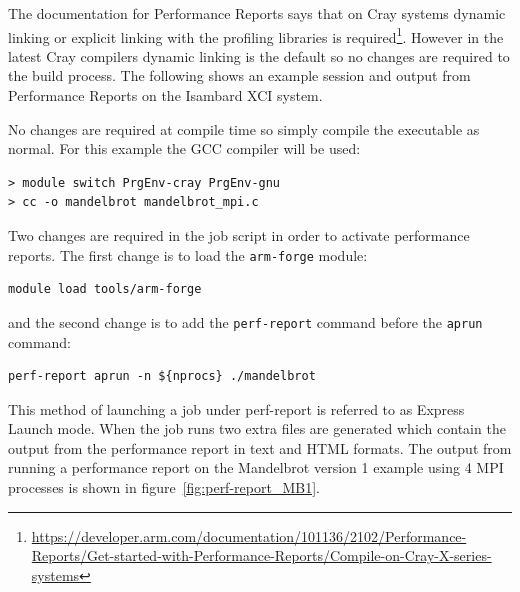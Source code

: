 \documentclass[a4paper,titlepage]{article}
\begin{document}
The documentation for Performance Reports says that on Cray systems dynamic linking or explicit linking with the profiling libraries is required\footnote{\url{https://developer.arm.com/documentation/101136/2102/Performance-Reports/Get-started-with-Performance-Reports/Compile-on-Cray-X-series-systems}}. However in the latest Cray compilers dynamic linking is the default so no changes are required to the build process. The following shows an example session and output from Performance Reports on the Isambard XCI system.

No changes are required at compile time so simply compile the executable as normal. For this example the GCC compiler will be used:
\begin{verbatim}
> module switch PrgEnv-cray PrgEnv-gnu
> cc -o mandelbrot mandelbrot_mpi.c
\end{verbatim}
Two changes are required in the job script in order to activate performance reports. The first change is to load the \texttt{arm-forge} module:
\begin{verbatim}
module load tools/arm-forge
\end{verbatim}
and the second change is to add the \texttt{perf-report} command before the \texttt{aprun} command:
\begin{verbatim}
perf-report aprun -n ${nprocs} ./mandelbrot
\end{verbatim}
This method of launching a job under perf-report is referred to as Express Launch mode.
%
When the job runs two extra files are generated which contain the output from the performance report in text and HTML formats. The output from running a performance report on the Mandelbrot version 1 example using 4 MPI processes is shown in figure~\ref{fig:perf-report_MB1}.  
%
\end{document}
